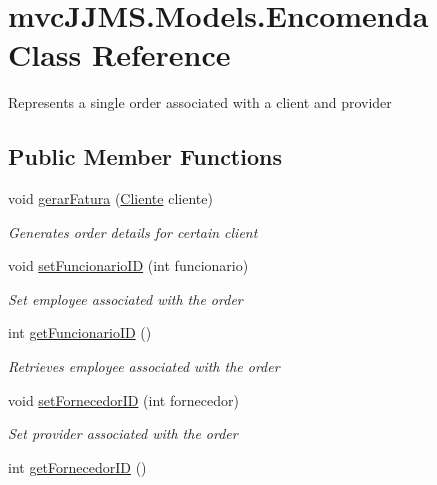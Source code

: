 \hypertarget{classmvc_j_j_m_s_1_1_models_1_1_encomenda}{}\section{mvc\+J\+J\+M\+S.\+Models.\+Encomenda Class Reference}
\label{classmvc_j_j_m_s_1_1_models_1_1_encomenda}


Represents a single order associated with a client and provider  


\subsection*{Public Member Functions}
\begin{DoxyCompactItemize}
\item 
void \mbox{\hyperlink{classmvc_j_j_m_s_1_1_models_1_1_encomenda_ad9b0bcfd5eba91703a412e5fd30718e0}{gerar\+Fatura}} (\mbox{\hyperlink{classmvc_j_j_m_s_1_1_models_1_1_cliente}{Cliente}} cliente)
\begin{DoxyCompactList}\small\item\em Generates order details for certain client \end{DoxyCompactList}\item 
void \mbox{\hyperlink{classmvc_j_j_m_s_1_1_models_1_1_encomenda_a63d79d71a12b1be75aa9a32d4ff41521}{set\+Funcionario\+ID}} (int funcionario)
\begin{DoxyCompactList}\small\item\em Set employee associated with the order \end{DoxyCompactList}\item 
int \mbox{\hyperlink{classmvc_j_j_m_s_1_1_models_1_1_encomenda_a65a991e592a8f489577b8cbdc2203d9e}{get\+Funcionario\+ID}} ()
\begin{DoxyCompactList}\small\item\em Retrieves employee associated with the order \end{DoxyCompactList}\item 
void \mbox{\hyperlink{classmvc_j_j_m_s_1_1_models_1_1_encomenda_ae4bfb28623c3e30657b03f5e09b45f13}{set\+Fornecedor\+ID}} (int fornecedor)
\begin{DoxyCompactList}\small\item\em Set provider associated with the order \end{DoxyCompactList}\item 
int \mbox{\hyperlink{classmvc_j_j_m_s_1_1_models_1_1_encomenda_ab05a84f1422750eb0af952c41e0963bf}{get\+Fornecedor\+ID}} ()

\end{DoxyCompactItemize}
